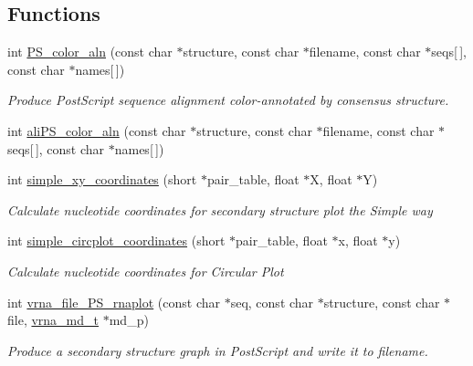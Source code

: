 \subsection*{Functions}
\begin{DoxyCompactItemize}
\item 
int \hyperlink{group__plotting__utils_ga821802c3685e37e15182341f6217470d}{P\+S\+\_\+color\+\_\+aln} (const char $\ast$structure, const char $\ast$filename, const char $\ast$seqs\mbox{[}$\,$\mbox{]}, const char $\ast$names\mbox{[}$\,$\mbox{]})\hypertarget{group__plotting__utils_ga821802c3685e37e15182341f6217470d}{}\label{group__plotting__utils_ga821802c3685e37e15182341f6217470d}

\begin{DoxyCompactList}\small\item\em Produce Post\+Script sequence alignment color-\/annotated by consensus structure. \end{DoxyCompactList}\item 
int \hyperlink{group__plotting__utils_gaab48d4dac655d688abe921389ac2847c}{ali\+P\+S\+\_\+color\+\_\+aln} (const char $\ast$structure, const char $\ast$filename, const char $\ast$seqs\mbox{[}$\,$\mbox{]}, const char $\ast$names\mbox{[}$\,$\mbox{]})
\item 
int \hyperlink{group__plotting__utils_gaf4b9173e7d3fd361c3c85e6def194123}{simple\+\_\+xy\+\_\+coordinates} (short $\ast$pair\+\_\+table, float $\ast$X, float $\ast$Y)
\begin{DoxyCompactList}\small\item\em Calculate nucleotide coordinates for secondary structure plot the {\itshape Simple way} \end{DoxyCompactList}\item 
int \hyperlink{group__plotting__utils_gac4ea13d35308f09940178d2b05a248c2}{simple\+\_\+circplot\+\_\+coordinates} (short $\ast$pair\+\_\+table, float $\ast$x, float $\ast$y)
\begin{DoxyCompactList}\small\item\em Calculate nucleotide coordinates for {\itshape Circular Plot} \end{DoxyCompactList}\item 
int \hyperlink{group__plotting__utils_gabdc8f6548ba4a3bc3cd868ccbcfdb86a}{vrna\+\_\+file\+\_\+\+P\+S\+\_\+rnaplot} (const char $\ast$seq, const char $\ast$structure, const char $\ast$file, \hyperlink{group__model__details_ga1f8a10e12a0a1915f2a4eff0b28ea17c}{vrna\+\_\+md\+\_\+t} $\ast$md\+\_\+p)
\begin{DoxyCompactList}\small\item\em Produce a secondary structure graph in Post\+Script and write it to \textquotesingle{}filename\textquotesingle{}. \end{DoxyCompactList}\item 

\end{DoxyCompactItemize}
